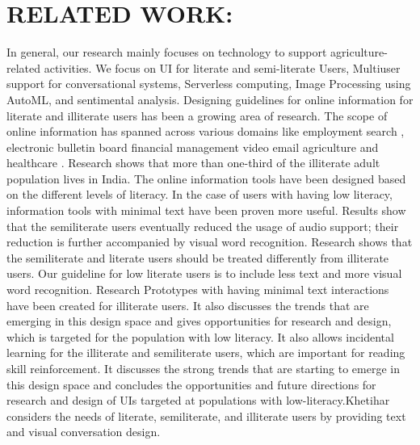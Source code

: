\documentclass[10pt,conference]{IEEEtran}
\begin{document}
	\section{RELATED WORK:}

{\raggedright
In general, our research mainly focuses on technology to support agriculture-related activities. We focus on UI for literate and semi-literate Users, Multiuser support for conversational systems, Serverless computing, Image Processing using AutoML, and sentimental analysis. Designing guidelines for online information for literate and illiterate users has been a growing area of research. The scope of online information has spanned across various domains like employment search , electronic bulletin board financial management  video email  agriculture and healthcare . Research shows that more than one-third of the illiterate adult population lives in India. The online information tools have been designed based on the different levels of literacy. In the case of users with having low literacy, information tools with minimal text have been proven more useful. Results show that the semiliterate users eventually reduced the usage of audio support; their reduction is further accompanied by visual word recognition. Research shows that the semiliterate and literate users should be treated differently from illiterate users. Our guideline for low literate users is to include less text and more visual word recognition. Research Prototypes with having minimal text interactions have been created for illiterate users. It also discusses the trends that are emerging in this design space and gives opportunities for research and design, which is targeted for the population with low literacy. It also allows incidental learning for the illiterate and semiliterate users, which are important for reading skill reinforcement. It discusses the strong trends that are starting to emerge in this design space and concludes the opportunities and future directions for research and design of UIs targeted at populations with low-literacy.Khetihar considers the needs of literate, semiliterate, and illiterate users by providing text and visual conversation design.
\newline
\newline
}
\end{document}
